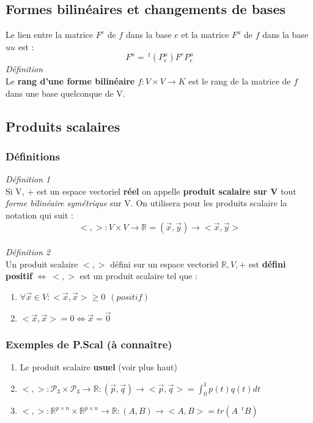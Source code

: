 \documentclass[12pt, a4paper]{article}
\begin{document}
\subsection{Formes bilinéaires et changements de bases}
Le lien entre la matrice $F^e$ de $f$ dans la base $e$ et la matrice $F^u$ de $f$ dans la base $uu$ est :
$$F^u =\ ^t(P_e^u)F^eP^u_e$$
\emph{Définition}\\
Le \textbf{rang d'une forme bilinéaire} $f : V \times V \rightarrow K$ est le rang de la matrice de $f$ dans une base quelconque de V.

\subsection{Produits scalaires}
\subsubsection{Définitions}
\emph{Définition 1}\\
Si V, + est un espace vectoriel \textbf{réel} on appelle \textbf{produit scalaire sur V} tout \textit{forme bilinéaire symétrique} sur V. On utilisera pour les produits scalaire la notation qui suit :
$$< , > : V \times V \rightarrow \mathbb{R} = (\vec{x}, \vec{y}) \rightarrow <\vec{x}, \vec{y}>$$\\

\emph{Définition 2}\\
Un produit scalaire $< , >$ défini sur un espace vectoriel $\mathbb{R}, V, +$ est \textbf{défini positif} $\Leftrightarrow\  < , >$ est un produit scalaire tel que :
\begin{enumerate}
\item $\forall \vec{x} \in V : <\vec{x}, \vec{x}> \geq 0\ \ (positif)$
\item $< \vec{x}, \vec{x}> = 0 \Leftrightarrow \vec{x} = \vec{0}$
\end{enumerate}
\subsubsection{Exemples de P.Scal (à connaître)}
\begin{enumerate}
\item Le produit scalaire \textbf{usuel} (voir plus haut)
\item $< , > : \mathcal{P}_3 \times \mathcal{P}_3 \rightarrow \mathbb{R} : (\vec{p}, \vec{q}) \rightarrow <\vec{p}, \vec{q}> = \int_0^1 p(t)q(t) dt$
\item $< , > : \mathbb{R}^{p \times n} \times \mathbb{R}^{p \times n} \rightarrow \mathbb{R} : (A, B) \rightarrow <A, B> = tr(A\ \ ^tB)$
\end{enumerate}
\end{document}
